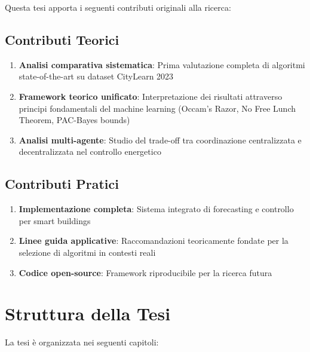 \documentclass[12pt,a4paper,twoside]{report}
\begin{document}
Questa tesi apporta i seguenti contributi originali alla ricerca:

\subsection{Contributi Teorici}

\begin{enumerate}
    \item \textbf{Analisi comparativa sistematica}: Prima valutazione completa di algoritmi state-of-the-art su dataset CityLearn 2023
    
    \item \textbf{Framework teorico unificato}: Interpretazione dei risultati attraverso principi fondamentali del machine learning (Occam's Razor, No Free Lunch Theorem, PAC-Bayes bounds)
    
    \item \textbf{Analisi multi-agente}: Studio del trade-off tra coordinazione centralizzata e decentralizzata nel controllo energetico
\end{enumerate}

\subsection{Contributi Pratici}

\begin{enumerate}
    \item \textbf{Implementazione completa}: Sistema integrato di forecasting e controllo per smart buildings
    
    \item \textbf{Linee guida applicative}: Raccomandazioni teoricamente fondate per la selezione di algoritmi in contesti reali
    
    \item \textbf{Codice open-source}: Framework riproducibile per la ricerca futura
\end{enumerate}

\section{Struttura della Tesi}

La tesi è organizzata nei seguenti capitoli:
\end{document}
